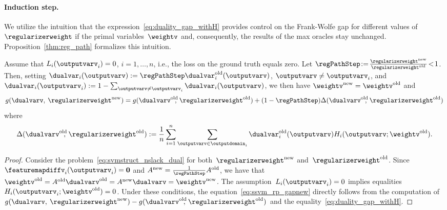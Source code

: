 \documentclass{article}
\begin{document}
\vspace{-3mm}\paragraph{Induction step.}
%
%

We utilize the intuition that the expression~\eqref{eq:duality_gap_withH} provides control on the Frank-Wolfe gap for different values of~$\regularizerweight$ if the primal variables~$\weightv$ and, consequently, the results of the max oracles stay unchanged. 
Proposition~\ref{thm:reg_path} formalizes this intuition.
\begin{proposition}
    \label{thm:reg_path}
    Assume that $L_i(\outputvarv_i) = 0$, $i=1,\dots,n$, i.e., the loss on the ground truth equals zero. Let $\regPathStep\!:=\!\frac{\regularizerweight^{\text{new}}}{\regularizerweight^{\text{old}}}\!<\!1$.
    Then, setting $\dualvar_i(\outputvarv) := \regPathStep \dualvar_i^{\text{old}}(\outputvarv)$, $\outputvarv \neq \outputvarv_i$,
    and $\dualvar_i(\outputvarv_i):=1-\sum_{\outputvarv \neq \outputvarv_i} \dualvar_i(\outputvarv)$, we then have $\weightv^{\text{new}} = \weightv^{\text{old}}$ and
    \begin{equation}
    g(\dualvarv,\: \regularizerweight^{\text{new}}) = g(\dualvarv^{\text{old}}\!\!\!,\: \regularizerweight^{\text{old}}) + (1 - \regPathStep) \Delta(\dualvarv^{\text{old}}\!\!\!,\: \regularizerweight^{\text{old}})
    \label{eq:ssvm_rp_gapnew}
    \end{equation}
    where\\[-4.5mm]
    \begin{equation}
    \notag
    \Delta(\dualvarv^{\text{old}}\!\!\!,\: \regularizerweight^{\text{old}}) := \frac1n \sum_{i=1}^n\sum_{\outputvarv \in \outputdomain_i} \dualvar_i^{\text{old}}(\outputvarv) H_i(\outputvarv; \weightv^{\text{old}}).
    \end{equation}
\end{proposition}
\begin{proof}
    \vspace{-2mm}Consider the problem~\eqref{eq:svmstruct_nslack_dual} for both~$\regularizerweight^{\text{new}}$ and~$\regularizerweight^{\text{old}}$\!\!\!.\:
    Since~$\featuremapdiffv_i(\outputvarv_i)=\bm{0}$ and $A^{\text{new}}=\frac{1}{\regPathStep}A^{\text{old}}$, we have that $\weightv^{\text{old}} = A^{\text{old}} \dualvarv^{\text{old}} = A^{\text{new}} \dualvarv = \weightv^{\text{new}}$.
    The assumption~$L_i(\outputvarv_i) = 0$ implies equalities~$H_i(\outputvarv_i; \weightv^{\text{old}})=0$.
    Under these conditions, the equation~\eqref{eq:ssvm_rp_gapnew} directly follows from the computation of $g(\dualvarv,\: \regularizerweight^{\text{new}})-g(\dualvarv^{\text{old}}\!\!\!,\: \regularizerweight^{\text{old}})$ and the equality~\eqref{eq:duality_gap_withH}.
\end{proof}
\end{document}
